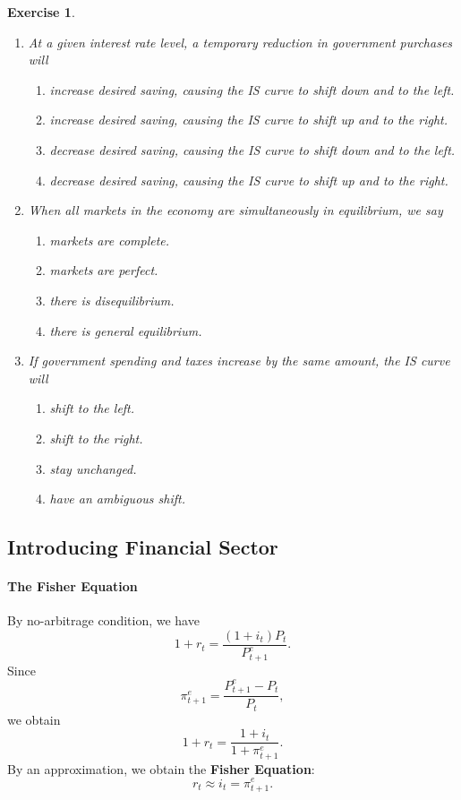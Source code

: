 \documentclass[12pt]{article}
\newtheorem{exercise}{Exercise}
\begin{document}
\begin{exercise}
    \begin{enumerate}[label=(\arabic*)]
        \item At a given interest rate level, a temporary reduction in government purchases will
        \begin{enumerate}[label=\Alph*.]
            \item increase desired saving, causing the IS curve to shift down and to the left.
            \item increase desired saving, causing the IS curve to shift up and to the right.
            \item decrease desired saving, causing the IS curve to shift down and to the left.
            \item decrease desired saving, causing the IS curve to shift up and to the right.
        \end{enumerate}
        \item When all markets in the economy are simultaneously in equilibrium, we say
        \begin{enumerate}[label=\Alph*.]
            \item markets are complete.
            \item markets are perfect.
            \item there is disequilibrium.
            \item there is general equilibrium.
        \end{enumerate}
        \item If government spending and taxes increase by the same amount, the IS curve will
        \begin{enumerate}[label=\Alph*.]
            \item shift to the left.
            \item shift to the right.
            \item stay unchanged.
            \item have an ambiguous shift.
        \end{enumerate}
    \end{enumerate}
\end{exercise}

\subsection*{Introducing Financial Sector}
\paragraph{The Fisher Equation}
By no-arbitrage condition, we have
\[ 1 + r_t = \frac{(1 + i_t) P_t}{P^e_{t+1}}.\]
Since
\[\pi^e_{t+1} = \frac{P^e_{t+1}-P_t}{P_t},\]
we obtain
\[1 + r_t = \frac{1 + i_t}{1 + \pi^e_{t+1}}.\]
By an approximation, we obtain the \textbf{Fisher Equation}:
\[r_t \approx i_t = \pi^e_{t+1}.\]
\end{document}
